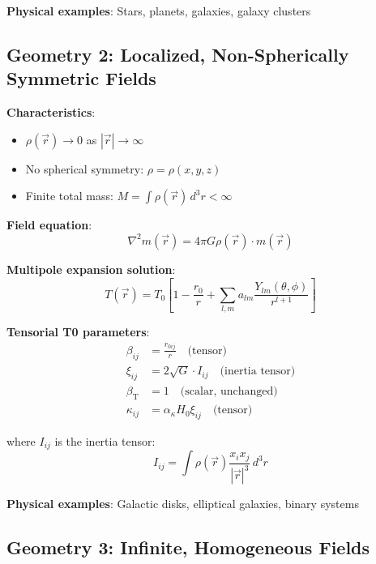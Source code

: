 \documentclass[12pt,a4paper]{article}
\newcommand{\betaT}{\beta_{\text{T}}}
\begin{document}
	\textbf{Physical examples}: Stars, planets, galaxies, galaxy clusters
	
	\subsection{Geometry 2: Localized, Non-Spherically Symmetric Fields}
	\label{subsec:geometry_localized_nonsphere}
	
	\textbf{Characteristics}:
	\begin{itemize}
		\item $\rho(\vec{r}) \to 0$ as $|\vec{r}| \to \infty$
		\item No spherical symmetry: $\rho = \rho(x,y,z)$
		\item Finite total mass: $M = \int \rho(\vec{r}) \, d^3r < \infty$
	\end{itemize}
	
	\textbf{Field equation}:
	\begin{equation}
		\nabla^2 m(\vec{r}) = 4\pi G \rho(\vec{r}) \cdot m(\vec{r})
	\end{equation}
	
	\textbf{Multipole expansion solution}:
	\begin{equation}
		T(\vec{r}) = T_0\left[1 - \frac{r_0}{r} + \sum_{l,m} a_{lm} \frac{Y_{lm}(\theta,\phi)}{r^{l+1}}\right]
	\end{equation}
	
	\textbf{Tensorial T0 parameters}:
	\begin{align}
		\beta_{ij} &= \frac{r_{0ij}}{r} \quad \text{(tensor)} \\
		\xi_{ij} &= 2\sqrt{G} \cdot I_{ij} \quad \text{(inertia tensor)} \\
		\betaT &= 1 \quad \text{(scalar, unchanged)} \\
		\kappa_{ij} &= \alpha_\kappa H_0 \xi_{ij} \quad \text{(tensor)}
	\end{align}
	
	where $I_{ij}$ is the inertia tensor:
	\begin{equation}
		I_{ij} = \int \rho(\vec{r}) \frac{x_i x_j}{|\vec{r}|^3} \, d^3r
	\end{equation}
	
	\textbf{Physical examples}: Galactic disks, elliptical galaxies, binary systems
	
	\subsection{Geometry 3: Infinite, Homogeneous Fields}
	\label{subsec:geometry_infinite}
	
\end{document}
